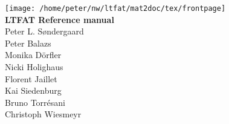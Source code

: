 \documentclass{book}
\begin{document}
\begin{titlepage}
\begin{center}
\texttt{[image: /home/peter/nw/ltfat/mat2doc/tex/frontpage]}
\\[0.4cm]
{ \huge \bfseries LTFAT Reference manual}\\[0.4cm]
\large {Peter L. S{\o}ndergaard } \\
\large {Peter Balazs } \\
\large {Monika D{\"o}rfler } \\
\large {Nicki Holighaus } \\ 
\large {Florent Jaillet } \\ 
\large {Kai Siedenburg} \\
\large {Bruno Torr{\'e}sani } \\
\large {Christoph Wiesmeyr } \\


\end{center}

\end{titlepage}

\tableofcontents














\end{document}
